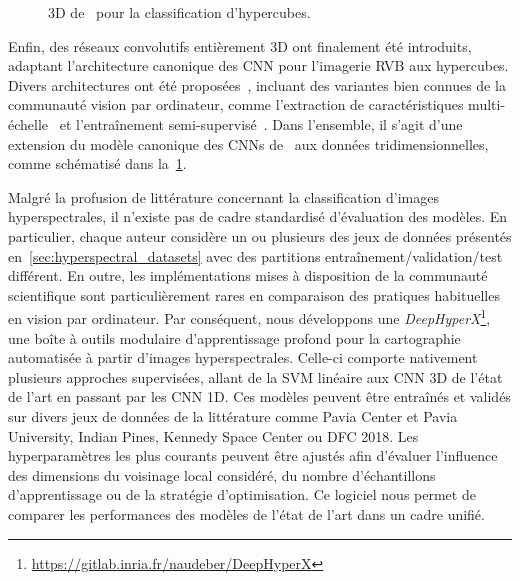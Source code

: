 \begin{figure}[h]
  \resizebox{\textwidth}{!}{}
  \caption[ 3D pour la classification d'hypercubes.]{ 3D de~\citet{chen_deep_2016} pour la classification d'hypercubes.}
  \label{fig:cnn3d_hsi}
\end{figure}

Enfin, des réseaux convolutifs entièrement 3D ont finalement été introduits, adaptant l'architecture canonique des \gls{CNN} pour l'imagerie \gls{RVB} aux hypercubes. Divers architectures ont été proposées~\cite{li_spectralspatial_2017}, incluant des variantes bien connues de la communauté vision par ordinateur, comme l'extraction de caractéristiques multi-échelle~\cite{he_multi-scale_2017} et l'entraînement semi-supervisé~\cite{liu_semi-supervised_2017}. Dans l'ensemble, il s'agit d'une extension du modèle canonique des \glspl{CNN} de~\citet{lecun_gradient-based_1998} aux données tridimensionnelles, comme schématisé dans la~\cref{fig:cnn3d_hsi}.

Malgré la profusion de littérature concernant la classification d'images hyperspectrales, il n'existe pas de cadre standardisé d'évaluation des modèles. En particulier, chaque auteur considère un ou plusieurs des jeux de données présentés en~\cref{sec:hyperspectral_datasets} avec des partitions entraînement/validation/test différent. En outre, les implémentations mises à disposition de la communauté scientifique sont particulièrement rares en comparaison des pratiques habituelles en vision par ordinateur. Par conséquent, nous développons une \emph{DeepHyperX}\footnote{\url{https://gitlab.inria.fr/naudeber/DeepHyperX}}, une boîte à outils modulaire d'apprentissage profond pour la cartographie automatisée à partir d'images hyperspectrales. Celle-ci comporte nativement plusieurs approches supervisées, allant de la \gls{SVM} linéaire aux \gls{CNN} 3D de l'état de l'art en passant par les \gls{CNN} 1D. Ces modèles peuvent être entraînés et validés sur divers jeux de données de la littérature comme Pavia Center et Pavia University, Indian Pines, Kennedy Space Center ou \gls{DFC} 2018. Les hyperparamètres les plus courants peuvent être ajustés afin d'évaluer l'influence des dimensions du voisinage local considéré, du nombre d'échantillons d'apprentissage ou de la stratégie d'optimisation. Ce logiciel nous permet de comparer les performances des modèles de l'état de l'art dans un cadre unifié.

